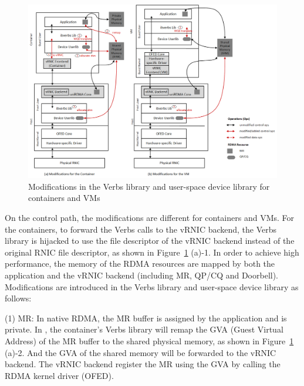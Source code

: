 \begin{figure}[!ht]
	\centering
	\includegraphics[width=0.8\linewidth]{images/verbs-driver}
	\caption{Modifications in the Verbs library and user-space device library for containers and VMs}
	\label{fig:verbs-driver}
\end{figure}


On the control path, the modifications are different for containers and VMs.
For the containers, to forward the Verbs calls to the vRNIC backend, the Verbs library is hijacked to use the file descriptor of the vRNIC backend instead of the original RNIC file descriptor, as shown in Figure~\ref{fig:verbs-driver} (a)-1. In order to achieve high performance, the memory of the RDMA resources are mapped by both the application and the vRNIC backend (including MR, QP/CQ and Doorbell). Modifications are introduced in the Verbs library and user-space device library as follows:

(1) MR: In native RDMA, the MR buffer is assigned by the application and is private.
In \sys, the container's Verbs library will remap the GVA (Guest Virtual Address) of the MR buffer to the shared physical memory, as shown in Figure~\ref{fig:verbs-driver} (a)-2. And the GVA of the shared memory will be forwarded to the vRNIC backend. The vRNIC backend register the MR using the GVA by calling the RDMA kernel driver (OFED).


